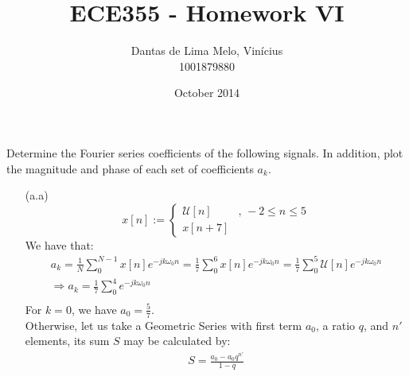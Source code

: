 \documentclass{article}
\title{ECE355 - Homework VI}
\author{Dantas de Lima Melo, Vinícius \\ \small{1001879880}}
\date{October 2014}
\begin{document}
\maketitle

\setcounter{section}{2}
\section{}
    \setcounter{subsection}{27}
    \subsection{} Determine the Fourier series coefficients of the following signals. In addition, plot the magnitude and phase of each set of coefficients $a_{k}$.
    \begin{enumerate}
        \item[(a.a)]
            \begin{equation*}
                x[n] := \left\{\begin{array}{ll}
                    \mathcal{U}[n]&\textrm{, } -2 \leq n \leq 5  \\
                    x[n+7]
                \end{array}\right.
            \end{equation*}
            We have that:
            \begin{equation*}
                \begin{array}{l}
                    a_{k} = \frac{1}{N}\sum\limits_{0}^{N-1} x[n]e^{-jk\omega_{0}n} = \frac{1}{7}\sum\limits_{0}^{6} x[n]e^{-jk\omega_{0}n} = \frac{1}{7}\sum\limits_{0}^{5} \mathcal{U}[n]e^{-jk\omega_{0}n}\\
                    \Rightarrow a_{k} = \frac{1}{7}\sum\limits_{0}^{4} e^{-jk\omega_{0}n}  \\
                \end{array}
            \end{equation*}
            For $k = 0$, we have $a_{0} = \frac{5}{7}$. \\
            Otherwise, let us take a Geometric Series with first term $a_{0}$, a ratio $q$, and $n'$ elements, its sum $S$ may be calculated by:
            \begin{equation} \label{eq:28a1}
                \begin{array}{l}
                    S = \frac{a_{0}-a_{0}q^{n'}}{1-q}   \\
                \end{array}
            \end{equation}

\end{enumerate}
\end{document}
